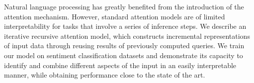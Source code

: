 Natural language processing has greatly benefited from the introduction of the attention mechanism. However, standard attention models are of limited interpretability for tasks that involve a series of inference steps. We describe an iterative recursive attention model, which constructs incremental representations of input data through reusing results of previously computed queries. We train our model on sentiment classification datasets and demonstrate its capacity to identify and combine different aspects of the input in an easily interpretable manner, while obtaining performance close to the state of the art.
